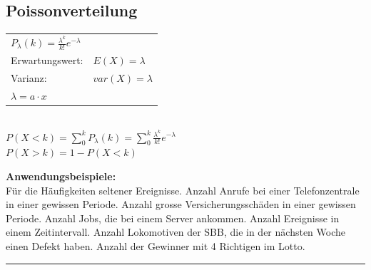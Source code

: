 	\subsection{Poissonverteilung }
	\begin{multicols}{2}
		\begin{tabular}{ll}
        $P_\lambda(k)=\frac{\lambda^k}{k!}e^{-\lambda}$ & \\
        Erwartungswert:  & $E(X)=\lambda$\\
        Varianz:  & $var(X)=\lambda$ \\
        $\lambda = a \cdot x$ \\
        \end{tabular} \\
         $P(X<k) = \sum_0^k P_\lambda(k)=\sum_0^k \frac{\lambda^k}{k!}e^{-\lambda}$ \\
         $P(X>k) = 1-P(X<k)$ \\
        \columnbreak
        
        {\bf Anwendungsbeispiele:} \\ Für die Häufigkeiten seltener
        Ereignisse. Anzahl Anrufe bei einer Telefonzentrale in einer gewissen
        Periode. Anzahl grosse Versicherungsschäden in einer gewissen Periode.
        Anzahl Jobs, die bei einem Server ankommen. Anzahl Ereignisse in
        einem Zeitintervall. Anzahl Lokomotiven der SBB, die in der nächsten Woche 
        einen Defekt haben. Anzahl der Gewinner mit 4 Richtigen im Lotto.
     \end{multicols}
        

\hrule

